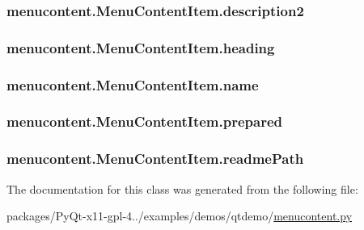 \subsubsection[{description2}]{\setlength{\rightskip}{0pt plus 5cm}menucontent.\+Menu\+Content\+Item.\+description2}\label{classmenucontent_1_1MenuContentItem_a32d80116838597b5bbd71950f6949e53}
\hypertarget{classmenucontent_1_1MenuContentItem_a8c58f4e4e0153510eb7e245e5c954b81}{}
\subsubsection[{heading}]{\setlength{\rightskip}{0pt plus 5cm}menucontent.\+Menu\+Content\+Item.\+heading}\label{classmenucontent_1_1MenuContentItem_a8c58f4e4e0153510eb7e245e5c954b81}
\hypertarget{classmenucontent_1_1MenuContentItem_ad8e23467f3f3ee4c3a82eec7b345f354}{}
\subsubsection[{name}]{\setlength{\rightskip}{0pt plus 5cm}menucontent.\+Menu\+Content\+Item.\+name}\label{classmenucontent_1_1MenuContentItem_ad8e23467f3f3ee4c3a82eec7b345f354}
\hypertarget{classmenucontent_1_1MenuContentItem_a8233f206bf1b1b428cff6587de3d7f83}{}
\subsubsection[{prepared}]{\setlength{\rightskip}{0pt plus 5cm}menucontent.\+Menu\+Content\+Item.\+prepared}\label{classmenucontent_1_1MenuContentItem_a8233f206bf1b1b428cff6587de3d7f83}
\hypertarget{classmenucontent_1_1MenuContentItem_abd9cd738ca36f8fad94f4ce27dc3a62e}{}
\subsubsection[{readme\+Path}]{\setlength{\rightskip}{0pt plus 5cm}menucontent.\+Menu\+Content\+Item.\+readme\+Path}\label{classmenucontent_1_1MenuContentItem_abd9cd738ca36f8fad94f4ce27dc3a62e}


The documentation for this class was generated from the following file\+:\begin{DoxyCompactItemize}
\item 
packages/\+Py\+Qt-\/x11-\/gpl-\/4../examples/demos/qtdemo/\hyperlink{menucontent_8py}{menucontent.\+py}\end{DoxyCompactItemize}
